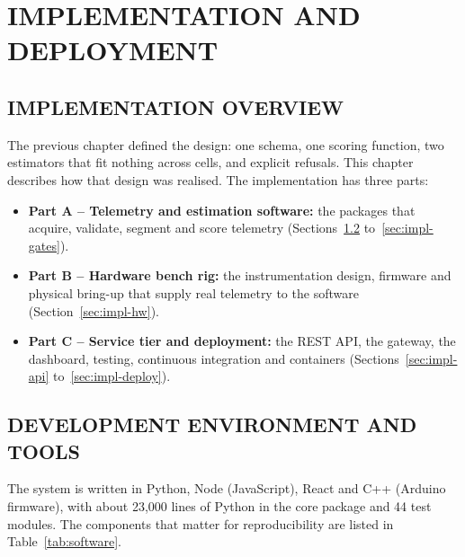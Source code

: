 \chapter{IMPLEMENTATION AND DEPLOYMENT}
\label{ch:implementation}

\section{IMPLEMENTATION OVERVIEW}

The previous chapter defined the design: one schema, one scoring function, two estimators that fit nothing across cells, and explicit refusals. This chapter describes how that design was realised. The implementation has three parts:

\begin{itemize}
    \item \textbf{Part A -- Telemetry and estimation software:} the packages that acquire, validate, segment and score telemetry (Sections~\ref{sec:impl-env} to~\ref{sec:impl-gates}).
    \item \textbf{Part B -- Hardware bench rig:} the instrumentation design, firmware and physical bring-up that supply real telemetry to the software (Section~\ref{sec:impl-hw}).
    \item \textbf{Part C -- Service tier and deployment:} the REST API, the gateway, the dashboard, testing, continuous integration and containers (Sections~\ref{sec:impl-api} to~\ref{sec:impl-deploy}).
\end{itemize}

\section{DEVELOPMENT ENVIRONMENT AND TOOLS}
\label{sec:impl-env}

The system is written in Python, Node (JavaScript), React and C++ (Arduino firmware), with about 23,000 lines of Python in the core package and 44 test modules. The components that matter for reproducibility are listed in Table~\ref{tab:software}.

